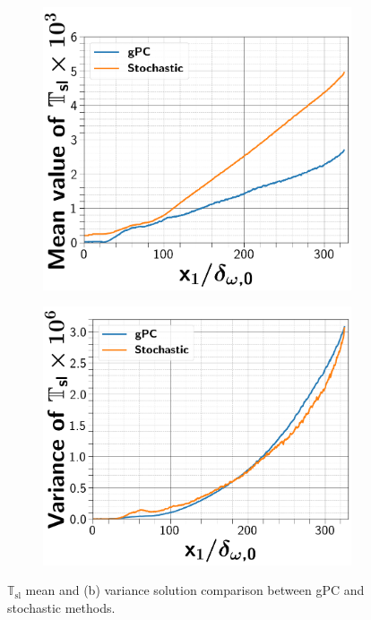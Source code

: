 \documentclass[conf]{new-aiaa}
\begin{document}
%
\begin{figure}[!ht]
\centering
\begin{subfigure}{.48\textwidth}
\includegraphics[width=0.99\columnwidth]{figs/meangpc.png}
\caption{}
\label{fig:mean1}
\end{subfigure}
\begin{subfigure}{.48\textwidth}
\includegraphics[width=0.99\columnwidth]{figs/vargpc.png}
\caption{}
\label{fig:mvar1}
\end{subfigure}
\caption{$\mathbb{T}_\mathrm{sl}$ mean and (b) variance solution comparison between gPC and stochastic methods.} 
\label{fig:tmeansol}
\end{figure}
\end{document}
